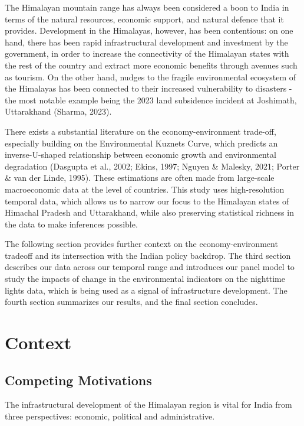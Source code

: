 \documentclass[doublespace,times,Afour,review]{template/sagej}
\begin{document}
The Himalayan mountain range has always been considered a boon to India in terms of the natural resources, economic support, and natural defence that it provides. Development in the Himalayas, however, has been contentious: on one hand, there has been rapid infrastructural development and investment by the government, in order to increase the connectivity of the Himalayan states with the rest of the country and extract more economic benefits through avenues such as tourism. On the other hand, nudges to the fragile environmental ecosystem of the Himalayas has been connected to their increased vulnerability to disasters - the most notable example being the 2023 land subsidence incident at Joshimath, Uttarakhand (Sharma, 2023).

There exists a substantial literature on the economy-environment trade-off, especially building on the Environmental Kuznets Curve, which predicts an inverse-U-shaped relationship between economic growth and environmental degradation (Dasgupta et al., 2002; Ekins, 1997; Nguyen \& Malesky, 2021; Porter \& van der Linde, 1995). These estimations are often made from large-scale macroeconomic data at the level of countries. This study uses high-resolution temporal data, which allows us to narrow our focus to the Himalayan states of Himachal Pradesh and Uttarakhand, while also preserving statistical richness in the data to make inferences possible. 

The following section provides further context on the economy-environment tradeoff and its intersection with the Indian policy backdrop. The third section describes our data across our temporal range and introduces our panel model to study the impacts of change in the environmental indicators on the nighttime lights data, which is being used as a signal of infrastructure development. The fourth section summarizes our results, and the final section concludes.



\section{Context}

\subsection{Competing Motivations}

The infrastructural development of the Himalayan region is vital for India from three perspectives: economic, political and administrative. 
\end{document}
